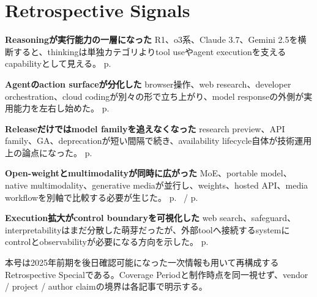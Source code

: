 \section*{Retrospective Signals}
\smallskip
\noindent \textbf{Reasoningが実行能力の一層になった} R1、o3系、Claude 3.7、Gemini 2.5を横断すると、thinkingは単独カテゴリよりtool useやagent executionを支えるcapabilityとして見える。 \hfill{\footnotesize p.~\pageref{pkg:reasoning}}
\par
\smallskip
\noindent \textbf{Agentのaction surfaceが分化した} browser操作、web research、developer orchestration、cloud codingが別々の形で立ち上がり、model responseの外側が実用能力を左右し始めた。 \hfill{\footnotesize p.~\pageref{pkg:agents}}
\par
\smallskip
\noindent \textbf{Releaseだけではmodel familyを追えなくなった} research preview、API family、GA、deprecationが短い間隔で続き、availability lifecycle自体が技術運用上の論点になった。 \hfill{\footnotesize p.~\pageref{pkg:lifecycle}}
\par
\smallskip
\noindent \textbf{Open-weightとmultimodalityが同時に広がった} MoE、portable model、native multimodality、generative mediaが並行し、weights、hosted API、media workflowを別軸で比較する必要が生じた。 \hfill{\footnotesize p.~\pageref{pkg:open} / p.~\pageref{pkg:multimodal}}
\par
\smallskip
\noindent \textbf{Execution拡大がcontrol boundaryを可視化した} web search、safeguard、interpretabilityはまだ分散した萌芽だったが、外部toolへ接続するsystemにcontrolとobservabilityが必要になる方向を示した。 \hfill{\footnotesize p.~\pageref{pkg:control}}
\par
\medskip
\begin{claimboundary}
本号は2025年前期を後日確認可能になった一次情報も用いて再構成するRetrospective Specialである。Coverage Periodと制作時点を同一視せず、vendor / project / author claimの境界は各記事で明示する。
\end{claimboundary}
\medskip
\tableofcontents

